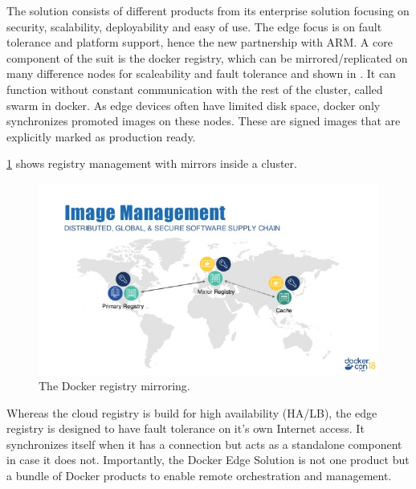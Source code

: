 The solution consists of different products from its enterprise solution focusing on security, scalability, deployability and easy of use. The edge focus is on fault tolerance and platform support, hence the new partnership with ARM. A core component of the suit is the docker registry, which can be mirrored/replicated on many difference nodes for scaleability and fault tolerance and shown in . It can function without constant communication with the rest of the cluster, called swarm in docker. As edge devices often have limited disk space, docker only synchronizes promoted images on these nodes. These are signed images that are explicitly marked as production ready.

\cref{fig:dockerRegistryForIoT} shows registry management with mirrors inside a cluster.
\begin{figure}[h!]
    \centering
    \includegraphics[scale=0.7]{figures/docker-edge-computing-with-docker-enterprise.jpg}
    \caption{The Docker registry mirroring.}
    \label{fig:dockerRegistryForIoT}
\end{figure}

Whereas the cloud registry is build for high availability (HA/LB), the edge registry is designed to have fault tolerance on it's own Internet access. It synchronizes itself when it has a connection but acts as a standalone component in case it does not.
Importantly, the Docker Edge Solution is not one product but a bundle of Docker products to enable remote orchestration and management.

